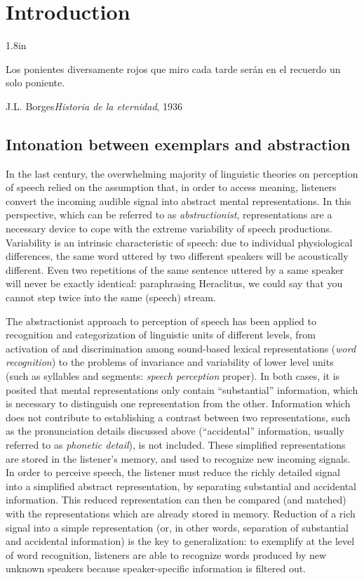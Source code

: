\chapter{Introduction}\label{sec1}
\epigraph{1.8in}{Los ponientes diversamente rojos que miro cada tarde serán en el recuerdo un solo poniente.}{J.L. Borges}{\textit{Historia de la eternidad}, 1936}

\section{Intonation between exemplars and abstraction}\label{sec10}
In the last century, the overwhelming majority of linguistic theories on perception of speech relied on the assumption that, in order to access meaning, listeners convert the incoming audible signal into abstract mental representations. In this perspective, which can be referred to as \textit{abstractionist}, representations are a necessary device to cope with the extreme variability of speech productions. Variability is an intrinsic characteristic of speech: due to individual physiological differences, the same word uttered by two different speakers will be acoustically different. Even two repetitions of the same sentence uttered by a same speaker will never be exactly identical: paraphrasing Heraclitus, we could say that you cannot step twice into the same (speech) stream. 

The abstractionist approach to perception of speech has been applied to recognition and categorization of linguistic units of different levels, from activation of and discrimination among sound-based lexical representations (\textit{word recognition}) to the problems of invariance and variability of lower level units (such as syllables and segments: \textit{speech perception} proper). In both cases, it is posited that mental representations only contain ``substantial'' information, which is necessary to distinguish one representation from the other. Information which does not contribute to establishing a contrast between two representations, such as the pronunciation details discussed above (``accidental'' information, usually referred to as \textit{phonetic detail}), is not included. These simplified representations are stored in the listener's memory, and used to recognize new incoming signals. In order to perceive speech, the listener must reduce the richly detailed signal into a simplified abstract representation, by separating substantial and accidental information. This reduced representation can then be compared (and matched) with the representations which are already stored in memory. Reduction of a rich signal into a simple representation (or, in other words, separation of substantial and accidental information) is the key to generalization: to exemplify at the level of word recognition, listeners are able to recognize words produced by new unknown speakers because speaker-specific information is filtered out.

